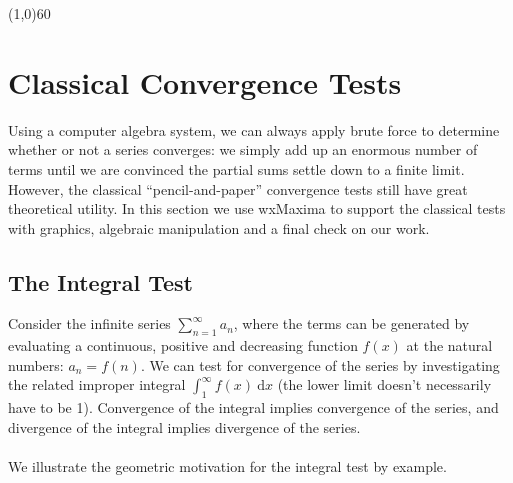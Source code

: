 \documentclass[10.5pt,twoside]{report}
\theoremstyle{definition}
\begin{document}
\line(1,0){60}
\linethickness{0.5mm}
\pagebreak


\section{Classical Convergence Tests}\label{Classical Convergence Tests}

Using a computer algebra system, we can always apply brute force to determine whether or not a series converges:  we simply add up an enormous number of terms until we are convinced the partial sums settle down to a finite limit.  However, the classical ``pencil-and-paper'' convergence tests still have great theoretical utility.  In this section we use wxMaxima to support the classical tests with graphics, algebraic manipulation and a final check on our work.


\subsection{The Integral Test}

Consider the infinite series $\sum_{n=1}^{\infty} a_n$, where the terms can be generated by evaluating a continuous, positive and decreasing function $f(x)$ at the natural numbers:  $a_n=f(n)$.  We can test for convergence of the series by investigating the related improper integral $\displaystyle \int_{1}^{\infty} f(x)\ \mathrm{d}x$ (the lower limit doesn't necessarily have to be 1). Convergence of the integral implies convergence of the series, and divergence of the integral implies divergence of the series.\\
${}$\\
We illustrate the geometric motivation for the integral test by example.
\end{document}
